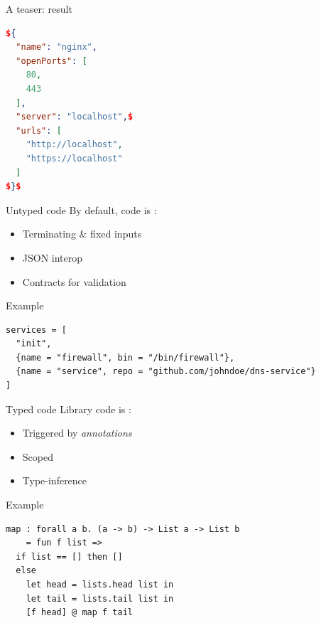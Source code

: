 \documentclass[a4paper]{beamer}
\newcommand{\couleur}[2]{{\color{#1}{#2}}}
\begin{document}
\begin{frame}[fragile]{A teaser: result}
\begin{lstlisting}[language=Json,title={nginx.json}]
${
  "name": "nginx",
  "openPorts": [
    80,
    443
  ],
  "server": "localhost",$
  "urls": [
    "http://localhost",
    "https://localhost"
  ]
$}$
\end{lstlisting}
\end{frame}

\begin{frame}[fragile]{Untyped code}
    By default, code is \couleur{pink-froly}{untyped}:
    \begin{itemize}
        \item Terminating \& fixed inputs
        \item JSON interop
        \item Contracts for validation
    \end{itemize}

    \begin{exampleblock}{Example}
\begin{lstlisting}[language=Nickel]
services = [
  "init",
  {name = "firewall", bin = "/bin/firewall"},
  {name = "service", repo = "github.com/johndoe/dns-service"}
]
\end{lstlisting}
    \end{exampleblock}
\end{frame}

\begin{frame}[fragile]{Typed code}
    Library code is \couleur{blue-portage}{statically typed}:
    \begin{itemize}
        \item Triggered by \emph{annotations}
        \item Scoped
        \item Type-inference
    \end{itemize}

\begin{exampleblock}{Example}
   \begin{lstlisting}[language=Nickel]
map : forall a b. (a -> b) -> List a -> List b
    = fun f list =>
  if list == [] then []
  else
    let head = lists.head list in
    let tail = lists.tail list in
    [f head] @ map f tail
\end{lstlisting}
\end{exampleblock}
\end{frame}
\end{document}
